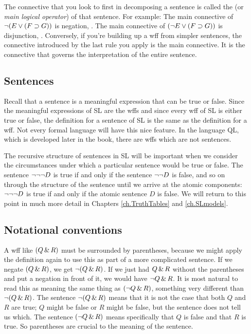 The connective that you look to first in decomposing a sentence is called the  (or \emph{main logical operator}) of that sentence. For example: The main connective of $\neg (E \vee (F \supset G))$ is negation, \enot. The main connective of $(\neg E \vee (F \supset G))$ is disjunction, \eor. Conversely, if you're building up a wff from simpler sentences, the connective introduced by the last rule you apply is the main connective. It is the connective that governs the interpretation of the entire sentence.


\subsection{Sentences}
Recall that a sentence is a meaningful expression that can be true or false. Since the meaningful expressions of SL are the wffs and since every wff of SL is either true or false, the definition for a sentence of SL is the same as the definition for a wff. Not every formal language will have this nice feature. In the language QL, which is developed later in the book, there are wffs which are not sentences. 

The recursive structure of sentences in SL will be important when we consider the circumstances under which a particular sentence would be true or false. The sentence $\neg \neg \neg D$ is true if and only if the sentence $\neg \neg D$ is false, and so on through the structure of the sentence until we arrive at the atomic components: $\neg \neg \neg D$ is true if and only if the atomic sentence $D$ is false. We will return to this point in much more detail in Chapters \ref{ch.TruthTables} and \ref{ch.SLmodels}.



\subsection{Notational conventions}
\label{SLconventions}
A wff like $(Q \,\&\, R)$ must be surrounded by parentheses, because we might apply the definition again to use this as part of a more complicated sentence. If we negate $(Q \,\&\, R)$, we get $\neg(Q \,\&\, R)$. If we just had $Q \,\&\, R$ without the parentheses and put a negation in front of it, we would have $\neg Q \,\&\, R$. It is most natural to read this as meaning the same thing as $(\neg Q \,\&\, R)$, something very different than $\neg(Q\,\&\, R)$. The sentence $\neg(Q \,\&\, R)$ means that it is not the case that both $Q$ and $R$ are true; $Q$ might be false or $R$ might be false, but the sentence does not tell us which. The sentence $(\neg Q \,\&\, R)$ means specifically that $Q$ is false and that $R$ is true. So parentheses are crucial to the meaning of the sentence.

